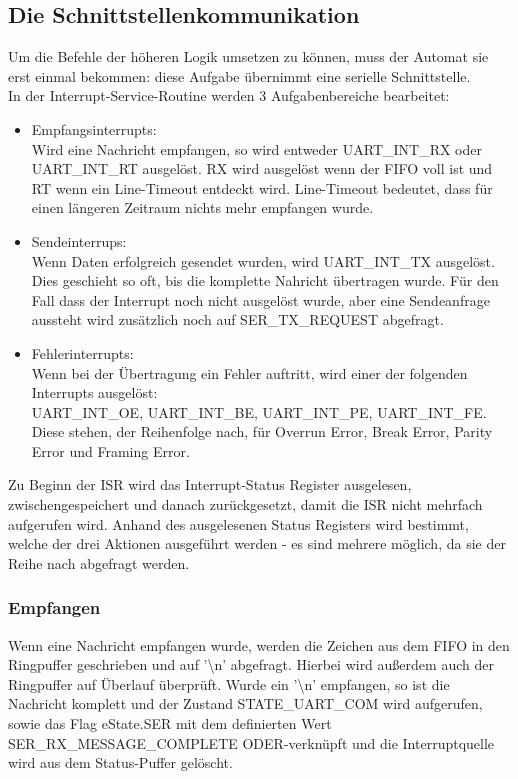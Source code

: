 \documentclass{scrartcl}
\begin{document}
\subsection{Die Schnittstellenkommunikation}
Um die Befehle der höheren Logik umsetzen zu können, muss der Automat sie erst einmal bekommen: diese Aufgabe übernimmt eine serielle Schnittstelle.\\
In der Interrupt-Service-Routine werden 3 Aufgabenbereiche bearbeitet:
\begin{itemize}
\item Empfangsinterrupts:\\
Wird eine Nachricht empfangen, so wird entweder UART\_INT\_RX oder UART\_INT\_RT ausgelöst. RX wird ausgelöst wenn der FIFO voll ist und RT wenn ein Line-Timeout entdeckt wird. Line-Timeout bedeutet, dass für einen längeren Zeitraum nichts mehr empfangen wurde.

\item Sendeinterrups:\\
Wenn Daten erfolgreich gesendet wurden, wird UART\_INT\_TX ausgelöst. Dies geschieht so oft, bis die komplette Nahricht übertragen wurde. Für den Fall dass der Interrupt noch nicht ausgelöst wurde, aber eine Sendeanfrage aussteht wird zusätzlich noch auf SER\_TX\_REQUEST abgefragt.

\item Fehlerinterrupts:\\
Wenn bei der Übertragung ein Fehler auftritt, wird einer der folgenden Interrupts ausgelöst:\\
UART\_INT\_OE, UART\_INT\_BE, UART\_INT\_PE, UART\_INT\_FE. Diese stehen, der Reihenfolge nach, für Overrun Error, Break Error, Parity Error und Framing Error.

\end{itemize}
Zu Beginn der ISR wird das Interrupt-Status Register ausgelesen, zwischengespeichert und danach zurückgesetzt, damit die ISR nicht mehrfach aufgerufen wird. Anhand des ausgelesenen Status Registers wird bestimmt, welche der drei Aktionen ausgeführt werden - es sind mehrere möglich, da sie der Reihe nach abgefragt werden.

\subsubsection{Empfangen}
Wenn eine Nachricht empfangen wurde, werden die Zeichen aus dem FIFO in den Ringpuffer geschrieben und auf '\textbackslash n' abgefragt. Hierbei wird außerdem auch der Ringpuffer auf Überlauf überprüft. Wurde ein '\textbackslash n' empfangen, so ist die Nachricht komplett und der Zustand STATE\_UART\_COM wird aufgerufen, sowie das Flag eState.SER mit dem definierten Wert SER\_RX\_MESSAGE\_COMPLETE ODER-verknüpft und die Interruptquelle wird aus dem Status-Puffer gelöscht.
\end{document}
